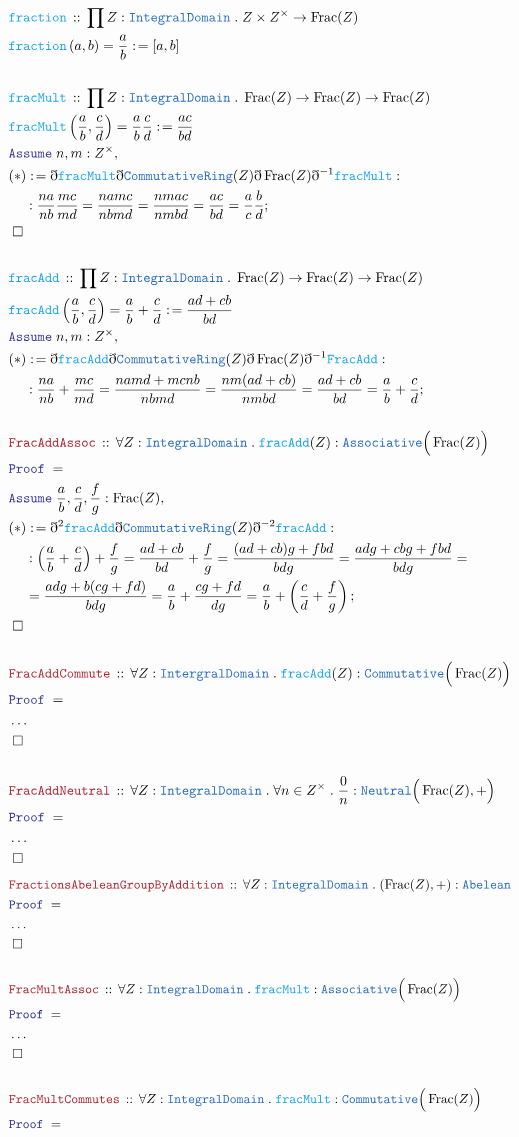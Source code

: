 \documentclass[12pt]{scrartcl}
\newcommand{\TYPE}[1]{\textcolor{NavyBlue}{\mathtt{#1}}}
\newcommand{\FUNC}[1]{\textcolor{Cerulean}{\mathtt{#1}}}
\newcommand{\LOGIC}[1]{\textcolor{Blue}{\mathtt{#1}}}
\newcommand{\THM}[1]{\textcolor{Maroon}{\mathtt{#1}}}
\renewcommand{\.}{\; . \;}
\newcommand{\de}{: \kern 0.1pc =}
\newcommand{\Act}[1]{\left( #1 \right)}
\newcommand{\Theorem}[2]{& \THM{#1} \, :: \, #2 \\ & \Proof = \\ }
\newcommand{\DeclareFunc}[2]{& \FUNC{#1} \, :: \, #2 \\}
\newcommand{\DefineNamedFunc}[4]{&  \FUNC{#1}\Act{#2} = #3 \de #4 \\}
\newcommand{\NewLine}{\\ & \kern 1pc}
\newcommand{\Page}[1]{ \begin{align*} #1 \end{align*}   }
\newcommand{ \bd }{ \ByDef }
\newcommand{\NoProof}{ & \ldots \\ \EndProof}
\newcommand{\Conclude}[3]{& #1 \de #2 : #3; \\}
\newcommand{\Assume}[2]{& \LOGIC{Assume} \; #1 : #2, \\}
\newcommand{\QED}{\; \square}
\newcommand{\EndProof}{& \QED \\}
\newcommand{\ByDef}{\eth}
\newcommand{\Proof}{\LOGIC{Proof} \; }
\DeclareMathOperator{\Frac}{Frac}
\begin{document}
\Page{
	\DeclareFunc{fraction}{\prod Z : \TYPE{IntegralDomain} \. Z \times Z^\times \to \Frac(Z)}
	\DefineNamedFunc{fraction}{a,b}{\frac{a}{b}}{[a,b]}
	\\
	\DeclareFunc{fracMult}{ \prod Z : \TYPE{IntegralDomain} \. \Frac(Z) \to \Frac(Z) \to \Frac(Z) }
	\DefineNamedFunc{fracMult}{\frac{a}{b},\frac{c}{d}}{\frac{a}{b}\frac{c}{d}}{\frac{ac}{bd}} 
	\Assume{n,m}{Z^\times}
	\Conclude{(*)}{\bd \FUNC{fracMult} \bd \TYPE{CommutativeRing}(Z) \bd \Frac(Z) \bd^{-1} \FUNC{fracMult} }
	{  \NewLine :
		\frac{na}{nb}\frac{mc}{md} = \frac{namc}{nbmd} = \frac{nmac}{nmbd} = \frac{ac}{bd} = \frac{a}{c}\frac{b}{d}   
	}
	\EndProof
	\\
	\DeclareFunc{fracAdd}{\prod Z : \TYPE{IntegralDomain} \. \Frac(Z) \to \Frac(Z) \to \Frac(Z)}
	\DefineNamedFunc{fracAdd}{\frac{a}{b},\frac{c}{d}}{\frac{a}{b} + \frac{c}{d}}{\frac{ad + cb}{bd}}
	\Assume{n,m}{Z^\times}
	\Conclude{(*)}{\bd \FUNC{fracAdd} \bd \TYPE{CommutativeRing}(Z) \bd \Frac(Z) \bd^{-1} \FUNC{FracAdd}}
	{ \NewLine :
		\frac{na}{nb} + \frac{mc}{md} = \frac{namd + mcnb}{nbmd} = 
		\frac{nm(ad + cb)}{nmbd} = \frac{ad + cb}{bd} = \frac{a}{b} + \frac{c}{d}
	}
	\\
	\Theorem{FracAddAssoc}{\forall Z : \TYPE{IntegralDomain} \. \FUNC{fracAdd}(Z) : \TYPE{Associative}\Big(\Frac(Z)\Big)}
	\Assume{\frac{a}{b}, \frac{c}{d},\frac{f}{g}}{\Frac(Z)}
	\Conclude{(*)}{ \bd^2 \FUNC{fracAdd} \bd \TYPE{CommutativeRing}(Z) \bd^{-2} \FUNC{fracAdd}  }
	{
		 \NewLine :
		\left( \frac{a}{b} + \frac{c}{d} \right) + \frac{f}{g} = \frac{ad + cb}{bd} + \frac{f}{g} =
		\frac{(ad + cb)g  + fbd}{bdg} =  
		\frac{adg + cbg + fbd }{bdg} =  \NewLine = 
		\frac{ adg  + b(cg + fd)}{bdg} =
		\frac{a}{b} + \frac{cg + fd}{dg} = 
		\frac{a}{b}  +\left( \frac{c}{d} + \frac{f}{g} \right)              
	}
	\EndProof
	\\
	\Theorem{FracAddCommute}{\forall Z : \TYPE{IntergralDomain} \. \FUNC{fracAdd}(Z) : \TYPE{Commutative}\Big(\Frac(Z)\Big) }
	\NoProof
	\\
	\Theorem{FracAddNeutral}{\forall Z : \TYPE{IntegralDomain} \. \forall n \in Z^\times \. \frac{0}{n} : \TYPE{Neutral}\Big( \Frac(Z),+ \Big) }
	\NoProof 
}\Page{
	\Theorem{FractionsAbeleanGroupByAddition}{\forall Z : \TYPE{IntegralDomain} \. (\Frac(Z),+) : \TYPE{Abelean}}
	\NoProof
	\\
	\Theorem{FracMultAssoc}{\forall Z : \TYPE{IntegralDomain} \. \FUNC{fracMult} : \TYPE{Associative}\Big(\Frac(Z)\Big)}
	\NoProof
	\\
	\Theorem{FracMultCommutes}{\forall Z : \TYPE{IntegralDomain} \. \FUNC{fracMult} : \TYPE{Commutative}\Big(\Frac(Z)\Big)}
}
\end{document}
